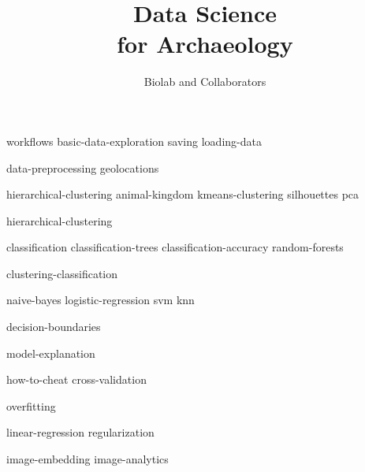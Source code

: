 \documentclass[symmetric, justified, a4paper]{tufte-book}
\title{Data Science \protect\\ for Archaeology}
\author[Biolab and Collaborators]{Biolab and Collaborators}
\begin{document}
\frontmatter

\maketitle



\tableofcontents

\mainmatter


{workflows}
{basic-data-exploration}
{saving}
{loading-data}

{data-preprocessing}
{geolocations}


{hierarchical-clustering}
{animal-kingdom}
{kmeans-clustering}
{silhouettes}
{pca}

{hierarchical-clustering}

{classification}
{classification-trees}
{classification-accuracy}
{random-forests}

{clustering-classification}

{naive-bayes}
{logistic-regression}
{svm}
{knn}

{decision-boundaries}

{model-explanation}

{how-to-cheat}
{cross-validation}

{overfitting}


{linear-regression}
{regularization}


{image-embedding}
{image-analytics}

\backmatter



\end{document}

